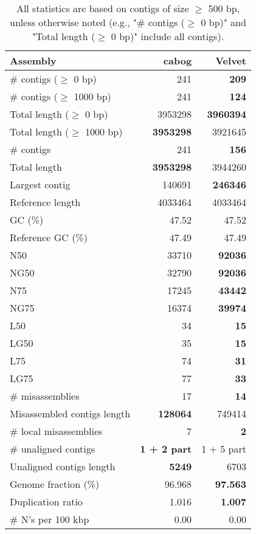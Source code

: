 \documentclass[12pt,a4paper]{article}
\begin{document}
\begin{table}[ht]
\begin{center}
\caption{All statistics are based on contigs of size $\geq$ 500 bp, unless otherwise noted (e.g., "\# contigs ($\geq$ 0 bp)" and "Total length ($\geq$ 0 bp)" include all contigs).}
\begin{tabular}{|l*{2}{|r}|}
\hline
Assembly & cabog & Velvet \\ \hline
\# contigs ($\geq$ 0 bp) & 241 & {\bf 209} \\ \hline
\# contigs ($\geq$ 1000 bp) & 241 & {\bf 124} \\ \hline
Total length ($\geq$ 0 bp) & 3953298 & {\bf 3960394} \\ \hline
Total length ($\geq$ 1000 bp) & {\bf 3953298} & 3921645 \\ \hline
\# contigs & 241 & {\bf 156} \\ \hline
Total length & {\bf 3953298} & 3944260 \\ \hline
Largest contig & 140691 & {\bf 246346} \\ \hline
Reference length & 4033464 & 4033464 \\ \hline
GC (\%) & 47.52 & 47.52 \\ \hline
Reference GC (\%) & 47.49 & 47.49 \\ \hline
N50 & 33710 & {\bf 92036} \\ \hline
NG50 & 32790 & {\bf 92036} \\ \hline
N75 & 17245 & {\bf 43442} \\ \hline
NG75 & 16374 & {\bf 39974} \\ \hline
L50 & 34 & {\bf 15} \\ \hline
LG50 & 35 & {\bf 15} \\ \hline
L75 & 74 & {\bf 31} \\ \hline
LG75 & 77 & {\bf 33} \\ \hline
\# misassemblies & 17 & {\bf 14} \\ \hline
Misassembled contigs length & {\bf 128064} & 749414 \\ \hline
\# local misassemblies & 7 & {\bf 2} \\ \hline
\# unaligned contigs & {\bf 1 + 2 part} & 1 + 5 part \\ \hline
Unaligned contigs length & {\bf 5249} & 6703 \\ \hline
Genome fraction (\%) & 96.968 & {\bf 97.563} \\ \hline
Duplication ratio & 1.016 & {\bf 1.007} \\ \hline
\# N's per 100 kbp & 0.00 & 0.00 \\ \hline

\end{tabular}
\end{center}
\end{table}
\end{document}
